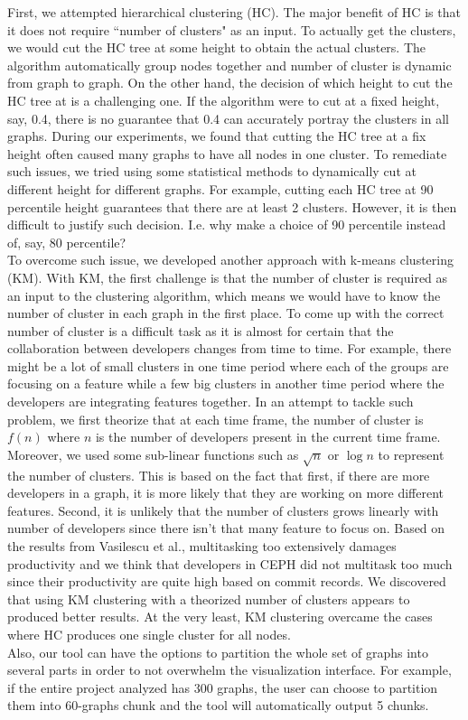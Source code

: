 \documentclass{article}
\begin{document}
First, we attempted hierarchical clustering (HC). The major benefit of HC is that it does not require ``number of clusters" as an input. To actually get the clusters, we would cut the HC tree at some height to obtain the actual clusters. The algorithm automatically group nodes together and number of cluster is dynamic from graph to graph. On the other hand, the decision of which height to cut the HC tree at is a challenging one. If the algorithm were to cut at a fixed height, say, 0.4, there is no guarantee that 0.4 can accurately portray the clusters in all graphs. During our experiments, we found that cutting the HC tree at a fix height often caused many graphs to have all nodes in one cluster. To remediate such issues, we tried using some statistical methods to dynamically cut at different height for different graphs. For example, cutting each HC tree at 90 percentile height guarantees that there are at least 2 clusters. However, it is then difficult to justify such decision. I.e. why make a choice of 90 percentile instead of, say, 80 percentile?\\
To overcome such issue, we developed another approach with k-means clustering (KM). With KM, the first challenge is that the number of cluster is required as an input to the clustering algorithm, which means we would have to know the number of cluster in each graph in the first place. To come up with the correct number of cluster is a difficult task as it is almost for certain that the collaboration between developers changes from time to time. For example, there might be a lot of small clusters in one time period where each of the groups are focusing on a feature while a few big clusters in another time period where the developers are integrating features together. In an attempt to tackle such problem, we first theorize that at each time frame, the number of cluster is $f(n)$ where $n$ is the number of developers present in the current time frame. Moreover, we used some sub-linear functions such as $\sqrt{n}$ or $\log{n}$ to represent the number of clusters. This is based on the fact that first, if there are more developers in a graph, it is more likely that they are working on more different features. Second, it is unlikely that the number of clusters grows linearly with number of developers since there isn't that many feature to focus on. Based on the results from Vasilescu et al.\citep{vasilescu2016sky}, multitasking too extensively damages productivity and we think that developers in CEPH did not multitask too much since their productivity are quite high based on commit records. We discovered that using KM clustering with a theorized number of clusters appears to produced better results. At the very least, KM clustering overcame the cases where HC produces one single cluster for all nodes.\\
Also, our tool can have the options to partition the whole set of graphs into several parts in order to not overwhelm the visualization interface. For example, if the entire project analyzed has 300 graphs, the user can choose to partition them into 60-graphs chunk and the tool will automatically output 5 chunks.
\end{document}

